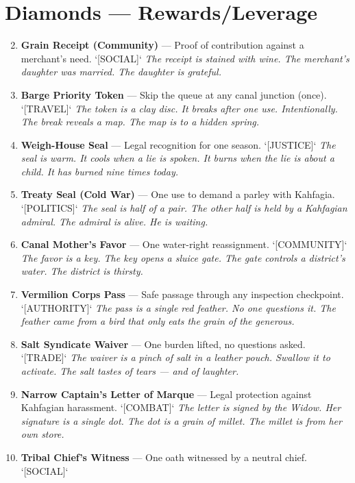 \section*{Diamonds --- Rewards/Leverage}
\label{sec:oshiira-rewards}
\begin{enumerate}
\setcounter{enumi}{1}
\item \textbf{Grain Receipt (Community)} --- Proof of contribution against a merchant's need. `[SOCIAL]`
  \hfill \textit{The receipt is stained with wine. The merchant's daughter was married. The daughter is grateful.}
\item \textbf{Barge Priority Token} --- Skip the queue at any canal junction (once). `[TRAVEL]`
  \hfill \textit{The token is a clay disc. It breaks after one use. Intentionally. The break reveals a map. The map is to a hidden spring.}
\item \textbf{Weigh-House Seal} --- Legal recognition for one season. `[JUSTICE]`
  \hfill \textit{The seal is warm. It cools when a lie is spoken. It burns when the lie is about a child. It has burned nine times today.}
\item \textbf{Treaty Seal (Cold War)} --- One use to demand a parley with Kahfagia. `[POLITICS]`
  \hfill \textit{The seal is half of a pair. The other half is held by a Kahfagian admiral. The admiral is alive. He is waiting.}
\item \textbf{Canal Mother's Favor} --- One water-right reassignment. `[COMMUNITY]`
  \hfill \textit{The favor is a key. The key opens a sluice gate. The gate controls a district's water. The district is thirsty.}
\item \textbf{Vermilion Corps Pass} --- Safe passage through any inspection checkpoint. `[AUTHORITY]`
  \hfill \textit{The pass is a single red feather. No one questions it. The feather came from a bird that only eats the grain of the generous.}
\item \textbf{Salt Syndicate Waiver} --- One burden lifted, no questions asked. `[TRADE]`
  \hfill \textit{The waiver is a pinch of salt in a leather pouch. Swallow it to activate. The salt tastes of tears --- and of laughter.}
\item \textbf{Narrow Captain's Letter of Marque} --- Legal protection against Kahfagian harassment. `[COMBAT]`
  \hfill \textit{The letter is signed by the Widow. Her signature is a single dot. The dot is a grain of millet. The millet is from her own store.}
\item \textbf{Tribal Chief's Witness} --- One oath witnessed by a neutral chief. `[SOCIAL]`

\end{enumerate}
